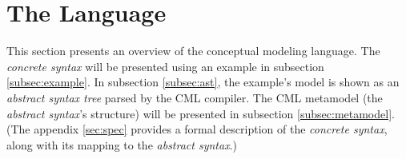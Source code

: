 \section{The Language}\label{sec:lang}
%
This section presents an overview of the conceptual modeling language.
The \emph{concrete syntax} will be presented using an example in subsection \ref{subsec:example}. 
In subsection \ref{subsec:ast},
the example's model is shown as an \emph{abstract syntax tree} parsed by the CML compiler.
The CML metamodel (the \emph{abstract syntax}'s structure) will be presented in subsection \ref{subsec:metamodel}. 
(The appendix \ref{sec:spec} provides a formal description of the \emph{concrete syntax},
along with its mapping to the \emph{abstract syntax}.)






